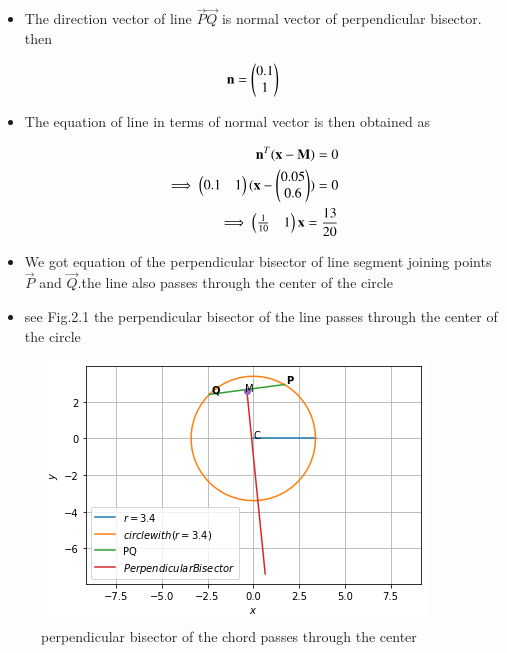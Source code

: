 \documentclass[journal,12pt,twocolumn]{IEEEtran}
\begin{document}
\begin{itemize}
    \item The direction vector of line $\vec{P}$$\vec{Q}$ is normal vector of perpendicular bisector. then
\end{itemize}
\begin{align}
    \mathbf{n}=\begin{pmatrix}0.1\\1\end{pmatrix}
\end{align}
\begin{itemize}
    \item The equation of line in terms of normal vector is then obtained as
\end{itemize}
\begin{align}
    \mathbf{n}^T(\mathbf{x}-\mathbf{M})=0
    \\
    \implies\begin{pmatrix}0.1&1\end{pmatrix}(\mathbf{x}-\begin{pmatrix}0.05\\0.6\end{pmatrix})=0
    \\
    \implies\begin{pmatrix}\frac{1}{10}&1\end{pmatrix}\mathbf{x}=\frac{13}{20}
\end{align}
\begin{itemize}
    \item We got equation of the perpendicular bisector of line segment joining points $\vec{P}$ and $\vec{Q}$.the line also passes through the center of the circle
\end{itemize}
\begin{itemize}
    \item see Fig.2.1 the perpendicular bisector of the line passes through the center of the circle
\end{itemize}
\begin{figure}[ht]
    \centering
    \includegraphics[width=\columnwidth]{FIG.3.png}
    \caption{perpendicular bisector of the chord passes through the center}
    \label{fig: perpenicular bisector of the chord passes through the center}
\end{figure}
\end{document}
